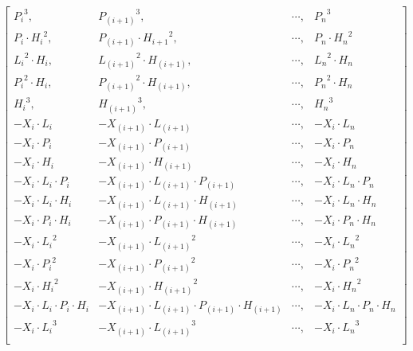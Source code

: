 \documentclass[10pt]{report}
\begin{document}
\begin{equation}
\begin{bmatrix}
{P_i}^3,                    & {P_{(i+1)}}^3,                                & \cdots, & {P_n}^3                    \\[4pt]
P_i \cdot {H_i}^2,          & P_{(i+1)} \cdot {H_{i+1}}^2,                  & \cdots, & P_n \cdot {H_n}^2          \\[4pt]
{L_i}^2 \cdot H_i,          & {L_{(i+1)}}^2 \cdot H_{(i+1)},                & \cdots, & {L_n}^2 \cdot H_n          \\[4pt]
{P_i}^2 \cdot H_i,          & {P_{(i+1)}}^2 \cdot H_{(i+1)},                & \cdots, & {P_n}^2 \cdot H_n          \\[4pt]
{H_i}^3,                    & {H_{(i+1)}}^3,                                & \cdots, & {H_n}^3                    \\[4pt]
-{X_i} \cdot L_i            & -{X_{(i+1)}} \cdot L_{(i+1)}                  & \cdots, & -{X_i} \cdot L_n           \\[4pt]
-{X_i} \cdot P_i            & -{X_{(i+1)}} \cdot P_{(i+1)}                  & \cdots, & -{X_i} \cdot P_n           \\[4pt]
-{X_i} \cdot H_i            & -{X_{(i+1)}} \cdot H_{(i+1)}                  & \cdots, & -{X_i} \cdot H_n           \\[4pt]
-{X_i} \cdot L_i \cdot P_i  & -{X_{(i+1)}} \cdot L_{(i+1)} \cdot P_{(i+1)}  & \cdots, & -{X_i} \cdot L_n \cdot P_n \\[4pt]
-{X_i} \cdot L_i \cdot H_i  & -{X_{(i+1)}} \cdot L_{(i+1)} \cdot H_{(i+1)}  & \cdots, & -{X_i} \cdot L_n \cdot H_n \\[4pt]
-{X_i} \cdot P_i \cdot H_i  & -{X_{(i+1)}} \cdot P_{(i+1)} \cdot H_{(i+1)}  & \cdots, & -{X_i} \cdot P_n \cdot H_n \\[4pt]
-{X_i} \cdot {L_i}^2        & -{X_{(i+1)}} \cdot {L_{(i+1)}}^2              & \cdots, & -{X_i} \cdot {L_n}^2       \\[4pt]
-{X_i} \cdot {P_i}^2        & -{X_{(i+1)}} \cdot {P_{(i+1)}}^2              & \cdots, & -{X_i} \cdot {P_n}^2       \\[4pt]
-{X_i} \cdot {H_i}^2        & -{X_{(i+1)}} \cdot {H_{(i+1)}}^2              & \cdots, & -{X_i} \cdot {H_n}^2       \\[4pt]
-{X_i} \cdot L_i \cdot P_i \cdot H_i  & -{X_{(i+1)}} \cdot L_{(i+1)} \cdot P_{(i+1)} \cdot H_{(i+1)}  & \cdots, & -{X_i} \cdot L_n \cdot P_n \cdot H_n \\[4pt]
-{X_i} \cdot {L_i}^3                  & -{X_{(i+1)}} \cdot {L_{(i+1)}}^3                              & \cdots, & -{X_i} \cdot {L_n}^3                 \\[4pt]

\end{bmatrix}
\end{equation}
\end{document}

